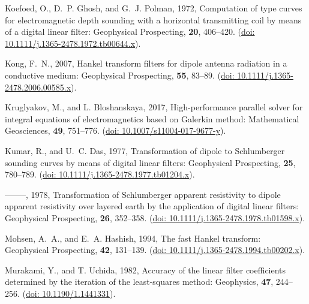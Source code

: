 \documentclass[a4paper, twoside, parskip, 10pt]{scrartcl}
\begin{document}
\begin{multicols}{2}
\begin{thebibliography}{}
Koefoed, O., D.~P. Ghosh, and G.~J. Polman,  1972, Computation of type curves
  for electromagnetic depth sounding with a horizontal transmitting coil by
  means of a digital linear filter: Geophysical Prospecting, {\bf 20},
  406--420.
\newblock (\href{https://doi.org/10.1111/j.1365-2478.1972.tb00644.x}{doi:
  10.1111/j.1365-2478.1972.tb00644.x}).

Kong, F.~N.,  2007, Hankel transform filters for dipole antenna radiation in a
  conductive medium: Geophysical Prospecting, {\bf 55}, 83--89.
\newblock (\href{https://doi.org/10.1111/j.1365-2478.2006.00585.x}{doi:
  10.1111/j.1365-2478.2006.00585.x}).

Kruglyakov, M., and L. Bloshanskaya,  2017, High-performance parallel solver
  for integral equations of electromagnetics based on {G}alerkin method:
  Mathematical Geosciences, {\bf 49}, 751--776.
\newblock (\href{https://doi.org/10.1007/s11004-017-9677-y}{doi:
  10.1007/s11004-017-9677-y}).

Kumar, R., and U.~C. Das,  1977, Transformation of dipole to {S}chlumberger
  sounding curves by means of digital linear filters: Geophysical Prospecting,
  {\bf 25}, 780--789.
\newblock (\href{https://doi.org/10.1111/j.1365-2478.1977.tb01204.x}{doi:
  10.1111/j.1365-2478.1977.tb01204.x}).

--------, 1978, Transformation of {S}chlumberger apparent resistivity to dipole
  apparent resistivity over layered earth by the application of digital linear
  filters: Geophysical Prospecting, {\bf 26}, 352--358.
\newblock (\href{https://doi.org/10.1111/j.1365-2478.1978.tb01598.x}{doi:
  10.1111/j.1365-2478.1978.tb01598.x}).

Mohsen, A.~A., and E.~A. Hashish,  1994, The fast {H}ankel transform:
  Geophysical Prospecting, {\bf 42}, 131--139.
\newblock (\href{https://doi.org/10.1111/j.1365-2478.1994.tb00202.x}{doi:
  10.1111/j.1365-2478.1994.tb00202.x}).

Murakami, Y., and T. Uchida,  1982, Accuracy of the linear filter coefficients
  determined by the iteration of the least-squares method: Geophysics, {\bf
  47}, 244--256.
\newblock (\href{https://doi.org/10.1190/1.1441331}{doi: 10.1190/1.1441331}).


\end{thebibliography}
\end{multicols}
\end{document}
